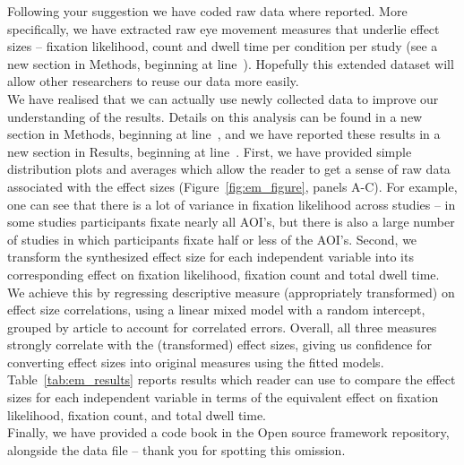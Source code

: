 Following your suggestion we have coded raw data where reported. More specifically, we have extracted raw eye movement measures that underlie effect sizes -- fixation likelihood, count and dwell time per condition per study (see a new section in Methods, beginning at line~). Hopefully this extended dataset will allow other researchers to reuse our data more easily.\\

We have realised that we can actually use newly collected data to improve our understanding of the results. Details on this analysis can be found in a new section in Methods, beginning at line~, and we have reported these results in a new section in Results, beginning at line~.
First, we have provided simple distribution plots and averages which allow the reader to get a sense of raw data associated with the effect sizes (Figure~\ref{fig:em_figure}, panels A-C). For example, one can see that there is a lot of variance in fixation likelihood across studies -- in some studies participants fixate nearly all AOI's, but there is also a large number of studies in which participants fixate half or less of the AOI's. Second, we transform the synthesized effect size for each independent variable into its corresponding effect on fixation likelihood, fixation count and total dwell time. We achieve this by regressing descriptive measure (appropriately transformed) on effect size correlations, using a linear mixed model with a random intercept, grouped by article to account for correlated errors. Overall, all three measures strongly correlate with the (transformed) effect sizes, giving us confidence for converting effect sizes into original measures using the fitted models. Table~\ref{tab:em_results} reports results which reader can use to compare the effect sizes for each independent variable in terms of the equivalent effect on fixation likelihood, fixation count, and total dwell time.\\

Finally, we have provided a code book in the Open source framework repository, alongside the data file -- thank you for spotting this omission.



